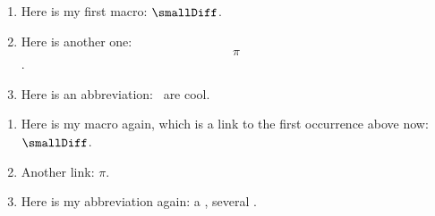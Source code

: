 \documentclass[english]{article}%
\begin{document}
\begin{enumerate}
  \item Here is my first macro: $\smallDiff$.
  \item Here is another one: \[\pi\].
  \item Here is an abbreviation: \HMM\ are cool.
\end{enumerate}

\newpage

\begin{enumerate}
  \item Here is my macro again, which is a link to the first occurrence above now: $\smallDiff$.
  \item Another link: $\pi$.
  \item Here is my abbreviation again: a \HMM, several \HMMs.
\end{enumerate}

\renewcommand{\nomname}{My list of Symbols}

\printnomenclature 
\end{document}
